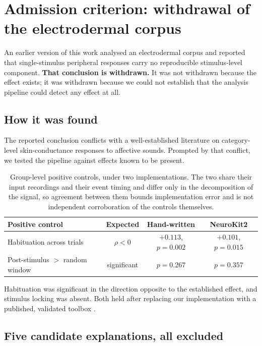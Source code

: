 \section{Admission criterion: withdrawal of the electrodermal corpus}

An earlier version of this work analysed an electrodermal corpus
\cite{kutt2022} and reported that single-stimulus peripheral responses carry no
reproducible stimulus-level component. \textbf{That conclusion is withdrawn.} It
was not withdrawn because the effect exists; it was withdrawn because we could not
establish that the analysis pipeline could detect any effect at all.

\subsection{How it was found}

The reported conclusion conflicts with a well-established literature on
category-level skin-conductance responses to affective sounds. Prompted by that
conflict, we tested the pipeline against effects known to be present.

\begin{table}[htbp]
\centering\small
\caption{Group-level positive controls, under two implementations. The two share
their input recordings and their event timing and differ only in the decomposition
of the signal, so agreement between them bounds implementation error and is not
independent corroboration of the controls themselves.}
\begin{tabular}{lccc}
\toprule
Positive control & Expected & Hand-written & NeuroKit2 \\
\midrule
Habituation across trials & $\rho < 0$ & $\mathbf{+0.113}$, $p = 0.002$
  & $\mathbf{+0.101}$, $p = 0.015$ \\
Post-stimulus $>$ random window & significant & $p = 0.267$ & $p = 0.357$ \\
\bottomrule
\end{tabular}
\end{table}

Habituation was significant in the direction opposite to the established effect,
and stimulus locking was absent. Both held after replacing our implementation with
a published, validated toolbox \cite{makowski2021}.

\subsection{Five candidate explanations, all excluded}

